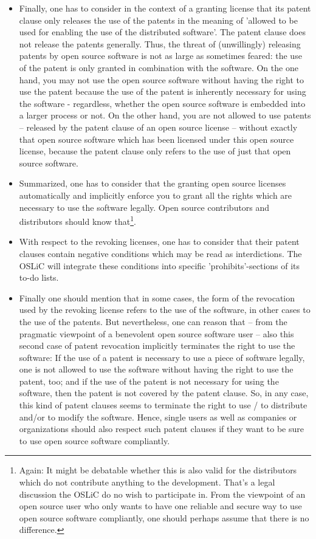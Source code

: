 \begin{itemize}
  \item Finally, one has to consider in the context of a granting license that
  its patent clause only releases the use of the patents in the meaning of
  'allowed to be used for enabling the use of the distributed software'. The
  patent clause does not release the patents generally. Thus, the threat of
  (unwillingly) releasing patents by open source software is not as large as
  sometimes feared: the use of the patent is only granted in combination with
  the software. On the one hand, you may not use the open source software
  without having the right to use the patent because the use of the patent is
  inherently necessary for using the software - regardless, whether the open
  source software is embedded into a larger process or not. On the other hand,
  you are not allowed to use patents -- released by the patent clause of an open
  source license -- without exactly that open source software which has been
  licensed under this open source license, because the patent clause only refers
  to the use of just that open source software.

  \item Summarized, one has to consider that the granting open source licenses
  automatically and implicitly enforce you to grant all the rights which are
  necessary to use the software legally. Open source contributors and
  distributors should know that\footnote{Again: It might be debatable whether
  this is also valid for the distributors which do not contribute anything to
  the development. That's a legal discussion the OSLiC do no wish to participate
  in. From the viewpoint of an open source user who only wants to have one
  reliable and secure way to use open source software compliantly, one should
  perhaps assume that there is no difference.}.

  \item With respect to the revoking licenses, one has to consider that their
  patent clauses contain negative conditions which may be read as interdictions.
  The OSLiC will integrate these conditions into specific 'prohibits'-sections
  of its to-do lists.
  
  \item Finally one should mention that in some cases, the form of the
  revocation used by the revoking license refers to the use of the software, in
  other cases to the use of the patents. But nevertheless, one can reason that
  -- from the pragmatic viewpoint of a benevolent open source software user --
  also this second case of patent revocation implicitly terminates the right to
  use the software: If the use of a patent is necessary to use a piece of
  software legally, one is not allowed to use the software without having the
  right to use the patent, too; and if the use of the patent is not necessary
  for using the software, then the patent is not covered by the patent clause.
  So, in any case, this kind of patent clauses seems to terminate the right to
  use / to distribute and/or to modify the software. Hence, single users as well
  as companies or organizations should also respect such patent clauses if they
  want to be sure to use open source software compliantly.
\end{itemize}

